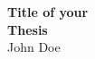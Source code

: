 \thispagestyle{empty}
\begin{center}
\Huge{\textbf{Title of your}} \\
\Huge{\textbf{Thesis}} \\
\vspace*{1cm}
\vspace*{1cm}
\vspace*{\fill}
\large{John Doe}\\
\end{center}

